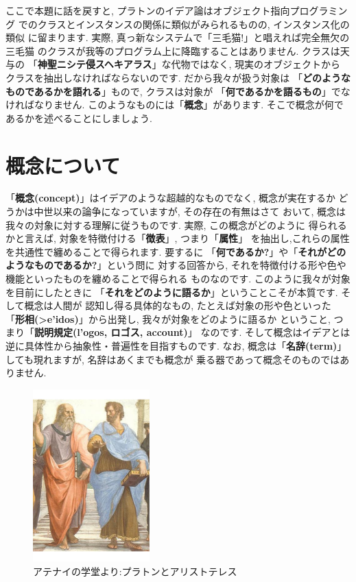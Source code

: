 \documentclass[b5j,8pt,twocolumn]{ltjsarticle}
\newcommand{\textgreek}[1]{\begingroup\fontencoding{LGR}\selectfont#1\endgroup}
\newcommand{\textgreek}[1]{\begingroup\fontencoding{LGR}\selectfont#1\endgroup}
\begin{document}
ここで本題に話を戻すと, プラトンのイデア論はオブジェクト指向プログラミング
でのクラスとインスタンスの関係に類似がみられるものの, インスタンス化の類似
に留まります. 実際, 真っ新なシステムで「三毛猫!」と唱えれば完全無欠の三毛猫
のクラスが我等のプログラム上に降臨することはありません. クラスは天与の
「\textbf{神聖ニシテ侵スヘキアラス}」な代物ではなく, 現実のオブジェクトから
クラスを抽出しなければならないのです. だから我々が扱う対象は
「\textbf{どのようなものであるかを語れる}」もので, クラスは対象が
「\textbf{何であるかを語るもの}」でなければなりません. このようなものには「\textbf{概念}」があります. そこで概念が何であるかを述べることにしましょう.
\newpage

\section{概念について}


「\textbf{概念(concept)}」はイデアのような超越的なものでなく, 概念が実在するか
どうかは中世以来の論争\cite{普遍論争}になっていますが, その存在の有無はさて
おいて, 概念は我々の対象に対する理解に従うものです. 実際, この概念がどのように
得られるかと言えば, 対象を特徴付ける「\textbf{徴表}」, つまり「\textbf{属性}」
を抽出し,これらの属性を共通性で纏めることで得られます. 要するに
「\textbf{何であるか?}」や「\textbf{それがどのようなものであるか?}」という問に
対する回答から, それを特徴付ける形や色や機能といったものを纏めることで得られる
ものなのです. このように我々が対象を目前にしたときに
「\textbf{それをどのように語るか}」ということこそが本質です. そして概念は人間が
認知し得る具体的なもの, たとえば対象の形や色といった
「\textbf{形相(\textgreek{>e'idos})}」から出発し, 我々が対象をどのように語るか
ということ, つまり「\textbf{説明規定(\textgreek{l'ogos}, ロゴス, account)}」
なのです. そして概念はイデアとは逆に具体性から抽象性・普遍性を目指すものです.
 なお, 概念は「\textbf{名辞(term)}」しても現れますが, 名辞はあくまでも概念が
乗る器であって概念そのものではありません.
\newline

\begin{figure}
\includegraphics[width=4.5cm]{Plato_and_Aristotle_in_The_School_of_Athens,_by_italian_Rafael.pdf}
\caption{アテナイの学堂より:プラトンとアリストテレス}
\label{fig:Plato-Aristotle}
\end{figure}
\end{document}
